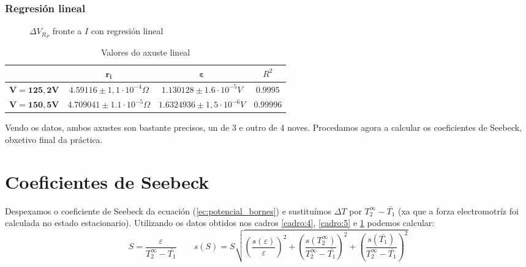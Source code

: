 \documentclass[12pt, a4paper, titlepage]{article}
\begin{document}
  \subsubsection{Regresión lineal}

  \begin{figure}[H]
    \hspace{12pt}
    
    \caption{$\Delta V_{R_P}$ fronte a $I$ con regresión lineal}
    \label{fig:vb}
  \end{figure}

  \begin{table}[H]
    \centering
    \begin{tabular}{c|c|c|c|}
    \cline{2-4}
                                                & $\mathbf{r_i}$               & $\mathbf{\varepsilon}$     & $R^2$           \\ \hline
    \multicolumn{1}{|c|}{$\mathbf{V = 125,2V}$} & $ 4.59116 \pm 1,1 \cdot 10^{-4} \Omega$ & $1.130128 \pm 1.6 \cdot 10^{-5} V$ & $0.9995$ \\ \hline
    \multicolumn{1}{|c|}{$\mathbf{V = 150,5V}$} & $ 4.709041 \pm 1.1 \cdot 10^{-5} \Omega$ & $1.6324936 \pm 1,5 \cdot 10^{-6} V$ & $0.99996$  \\ \hline
    \end{tabular}
    \caption{Valores do axuste lineal}
    \label{cadro:10}
  \end{table}

  Vendo os datos, ambos axustes son bastante precisos, un de 3 e outro de 4 noves. Procedamos agora a calcular os coeficientes de Seebeck, obxetivo final da práctica.
  

  \section{Coeficientes de Seebeck}

  Despexamos o coeficiente de Seebeck da ecuación (\ref{ec:potencial_bornes}) e sustituímos $\Delta T$ por $T_2^\infty - \bar{T_1}$ (xa que a forza electromotríz foi calculada no estado estacionario).
  Utilizando os datos obtidos nos cadros \ref{cadro:4}, \ref{cadro:5} e \ref{cadro:10} podemos calcular:
  \begin{equation}
    S = \frac{\varepsilon}{T_2^\infty - \bar{T_1}} \qquad s(S) = S\sqrt{\left( \frac{s(\varepsilon)}{\varepsilon} \right)^2 + \left( \frac{s(T_2^\infty)}{T_2^\infty - \bar{T_1}} \right)^2 + \left( \frac{s(\bar{T_1})}{T_2^\infty - \bar{T_1}} \right)^2}
  \end{equation}
\end{document}
